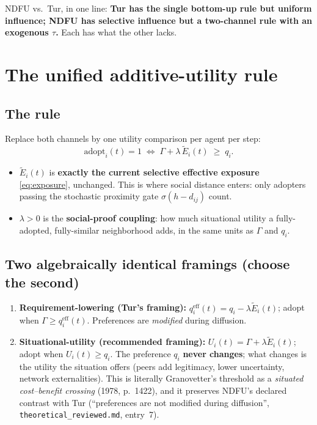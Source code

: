 \documentclass[11pt,a4paper]{article}
\newcommand{\Ee}{\tilde{E}}                 %
\newcommand{\eff}{\mathrm{eff}}
\newcommand{\code}[1]{\texttt{#1}}
\begin{document}
NDFU vs.\ Tur, in one line: \textbf{Tur has the single bottom-up rule but uniform
influence; NDFU has selective influence but a two-channel rule with an exogenous
$\tau$.} Each has what the other lacks.

\section{The unified additive-utility rule}
\label{sec:unified}

\subsection{The rule}

Replace both channels by one utility comparison per agent per step:
\begin{equation}
  \text{adopt}_i(t) = 1 \;\iff\; \Gamma + \lambda \, \Ee_i(t) \;\ge\; q_i .
  \label{eq:unified}
\end{equation}

\begin{itemize}
  \item $\Ee_i(t)$ is \textbf{exactly the current selective effective exposure}
    \eqref{eq:exposure}, unchanged. This is where social distance enters: only adopters
    passing the stochastic proximity gate $\sigma(h - d_{ij})$ count.
  \item $\lambda > 0$ is the \textbf{social-proof coupling}: how much situational utility
    a fully-adopted, fully-similar neighborhood adds, in the same units as $\Gamma$ and
    $q_i$.
\end{itemize}

\subsection{Two algebraically identical framings (choose the second)}
\label{sec:framings}

\begin{enumerate}
  \item \textbf{Requirement-lowering (Tur's framing):}
    $q_i^{\eff}(t) = q_i - \lambda \Ee_i(t)$; adopt when $\Gamma \ge q_i^{\eff}(t)$.
    Preferences are \emph{modified} during diffusion.
  \item \textbf{Situational-utility (recommended framing):}
    $U_i(t) = \Gamma + \lambda \Ee_i(t)$; adopt when $U_i(t) \ge q_i$. The preference
    $q_i$ \textbf{never changes}; what changes is the utility the situation offers (peers
    add legitimacy, lower uncertainty, network externalities). This is literally
    Granovetter's threshold as a \emph{situated cost--benefit crossing} (1978, p.~1422),
    and it preserves NDFU's declared contrast with Tur (``preferences are not modified
    during diffusion'', \code{theoretical\_reviewed.md}, entry~7).
\end{enumerate}
\end{document}
